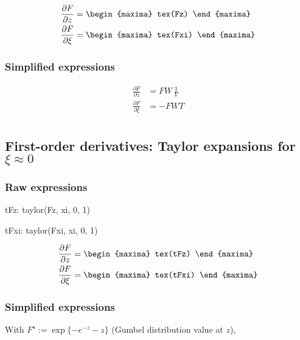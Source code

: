 {\color{MonVertF}
\begin{align*}
  \frac{\partial F}{\partial z}
  &=
    \begin{maxima}
       tex(Fz)
    \end{maxima} \\
  \frac{\partial F}{\partial \xi}
  &=
    \begin{maxima}
       tex(Fxi)
    \end{maxima} \\
\end{align*}
}
\subsubsection*{Simplified  expressions}
{\color{red}
\begin{align*}
  \frac{\partial F}{\partial z}
  &= F W \, \frac{1}{V} \\
  \frac{\partial F}{\partial \xi}
  &= - F W T \\
\end{align*}
}

\subsection{First-order derivatives: Taylor expansions
  for $\xi \approx 0$}

\subsubsection*{Raw  expressions}

\begin{maxima}
  tFz: taylor(Fz, xi, 0, 1)
\end{maxima}%
\begin{maxima}
  tFxi: taylor(Fxi, xi, 0, 1)
\end{maxima}%
{\color{MonVertF}
\begin{align*}
  \frac{\partial F}{\partial z}
  &=
    \begin{maxima}
       tex(tFz)
    \end{maxima} \\
  \frac{\partial F}{\partial \xi}
  &=
    \begin{maxima}
       tex(tFxi)
    \end{maxima} \\
\end{align*}}

\subsubsection*{Simplified expressions}
With {\color{red}$F^\star := \exp\{-e^{-z} - z\}$} (Gumbel distribution value at $z$),

